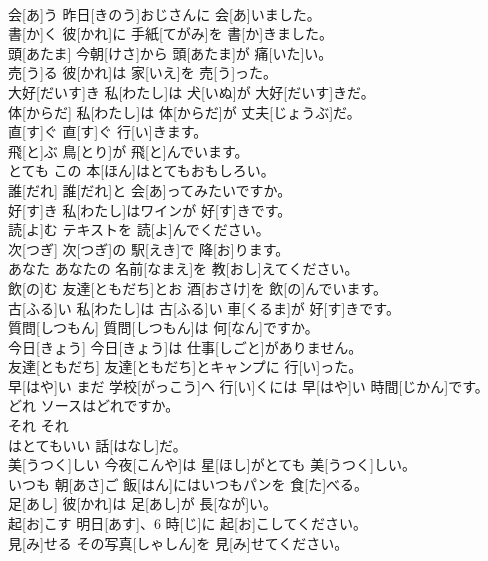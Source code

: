 \documentclass[8pt]{extreport}
\begin{document}
\begin{CJK}{UTF8}{min}
\\	会[あ]う	昨日[きのう]おじさんに 会[あ]いました。		
\\	書[か]く	彼[かれ]に 手紙[てがみ]を 書[か]きました。		
\\	頭[あたま]	今朝[けさ]から 頭[あたま]が 痛[いた]い。		
\\	売[う]る	彼[かれ]は 家[いえ]を 売[う]った。		
\\	大好[だいす]き	私[わたし]は 犬[いぬ]が 大好[だいす]きだ。		
\\	体[からだ]	私[わたし]は 体[からだ]が 丈夫[じょうぶ]だ。		
\\	直[す]ぐ	直[す]ぐ 行[い]きます。		
\\	飛[と]ぶ	鳥[とり]が 飛[と]んでいます。		
\\	とても	この 本[ほん]はとてもおもしろい。		
\\	誰[だれ]	誰[だれ]と 会[あ]ってみたいですか。		
\\	好[す]き	私[わたし]はワインが 好[す]きです。		
\\	読[よ]む	テキストを 読[よ]んでください。		
\\	次[つぎ]	次[つぎ]の 駅[えき]で 降[お]ります。		
\\	あなた	あなたの 名前[なまえ]を 教[おし]えてください。		
\\	飲[の]む	友達[ともだち]とお 酒[おさけ]を 飲[の]んでいます。		
\\	古[ふる]い	私[わたし]は 古[ふる]い 車[くるま]が 好[す]きです。		
\\	質問[しつもん]	質問[しつもん]は 何[なん]ですか。		
\\	今日[きょう]	今日[きょう]は 仕事[しごと]がありません。		
\\	友達[ともだち]	友達[ともだち]とキャンプに 行[い]った。		
\\	早[はや]い	まだ 学校[がっこう]へ 行[い]くには 早[はや]い 時間[じかん]です。		
\\	どれ	ソースはどれですか。		
\\	それ	それ
\\	はとてもいい 話[はなし]だ。		
\\	美[うつく]しい	今夜[こんや]は 星[ほし]がとても 美[うつく]しい。		
\\	いつも	朝[あさ]ご 飯[はん]にはいつもパンを 食[た]べる。		
\\	足[あし]	彼[かれ]は 足[あし]が 長[なが]い。		
\\	起[お]こす	明日[あす]、6 時[じ]に 起[お]こしてください。		
\\	見[み]せる	その写真[しゃしん]を 見[み]せてください。		

\end{CJK}
\end{document}
